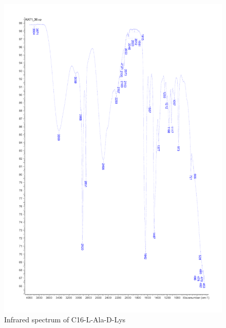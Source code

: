 \begin{figure}[ht!]
\centering
\includegraphics[scale=0.6]{IR/KAT1_30.pdf}
\caption{Infrared spectrum of C16-L-Ala-D-Lys}
\end{figure}


